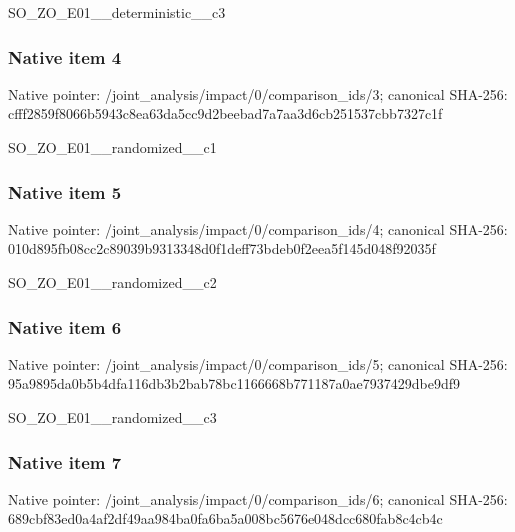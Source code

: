 \documentclass[10pt,a4paper]{article}
\begin{document}
\begingroup\raggedright\sloppy SO\_\allowbreak{}ZO\_\allowbreak{}E01\_\allowbreak{}\_\allowbreak{}deterministic\_\allowbreak{}\_\allowbreak{}c3\par\endgroup

\subsubsection{Native item 4}
Native pointer: /joint\_\allowbreak{}analysis/impact/0/comparison\_\allowbreak{}ids/3; canonical SHA-256: cfff2859f8066b5943c8ea63da5cc9d2beebad7a7aa3d6cb251537cbb7327c1f

\begingroup\raggedright\sloppy SO\_\allowbreak{}ZO\_\allowbreak{}E01\_\allowbreak{}\_\allowbreak{}randomized\_\allowbreak{}\_\allowbreak{}c1\par\endgroup

\subsubsection{Native item 5}
Native pointer: /joint\_\allowbreak{}analysis/impact/0/comparison\_\allowbreak{}ids/4; canonical SHA-256: 010d895fb08cc2c89039b9313348d0f1deff73bdeb0f2eea5f145d048f92035f

\begingroup\raggedright\sloppy SO\_\allowbreak{}ZO\_\allowbreak{}E01\_\allowbreak{}\_\allowbreak{}randomized\_\allowbreak{}\_\allowbreak{}c2\par\endgroup

\subsubsection{Native item 6}
Native pointer: /joint\_\allowbreak{}analysis/impact/0/comparison\_\allowbreak{}ids/5; canonical SHA-256: 95a9895da0b5b4dfa116db3b2bab78bc1166668b771187a0ae7937429dbe9df9

\begingroup\raggedright\sloppy SO\_\allowbreak{}ZO\_\allowbreak{}E01\_\allowbreak{}\_\allowbreak{}randomized\_\allowbreak{}\_\allowbreak{}c3\par\endgroup

\subsubsection{Native item 7}
Native pointer: /joint\_\allowbreak{}analysis/impact/0/comparison\_\allowbreak{}ids/6; canonical SHA-256: 689cbf83ed0a4af2df49aa984ba0fa6ba5a008bc5676e048dcc680fab8c4cb4c
\end{document}
